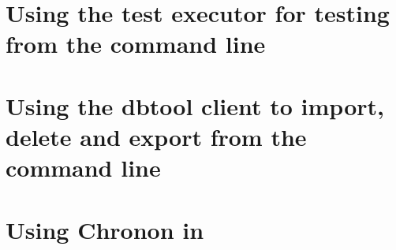 \clearpage

\section{Using the test executor for testing from the command line}


\section{Using the dbtool client to import, delete and export from the command line}
\label{DBTool}



\section{Using Chronon in \app{}}
\label{TasksChronon}
 
